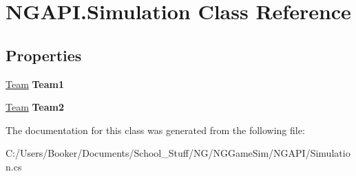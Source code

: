 \hypertarget{class_n_g_a_p_i_1_1_simulation}{}\section{N\+G\+A\+P\+I.\+Simulation Class Reference}
\label{class_n_g_a_p_i_1_1_simulation}
\subsection*{Properties}
\begin{DoxyCompactItemize}
\item 
\mbox{\label{class_n_g_a_p_i_1_1_simulation_aaed9da64b8730fe43573049f43dd4f96}} 
\hyperlink{class_n_g_a_p_i_1_1_team}{Team} {\bfseries Team1}
\item 
\mbox{\label{class_n_g_a_p_i_1_1_simulation_a2ab123f3b05571bef09c56c94b55a1f9}} 
\hyperlink{class_n_g_a_p_i_1_1_team}{Team} {\bfseries Team2}
\end{DoxyCompactItemize}


The documentation for this class was generated from the following file\+:\begin{DoxyCompactItemize}
\item 
C\+:/\+Users/\+Booker/\+Documents/\+School\+\_\+\+Stuff/\+N\+G/\+N\+G\+Game\+Sim/\+N\+G\+A\+P\+I/Simulation.\+cs\end{DoxyCompactItemize}
